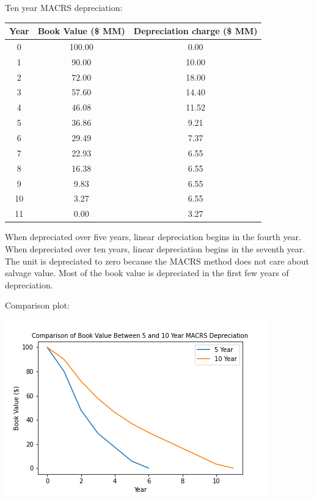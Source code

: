 \documentclass[12pt]{article}
\begin{document}
\begin{enumerate}
    Ten year MACRS depreciation:

    \begin{tabular}{|c|c|c|}
        \hline
        Year & Book Value (\$ MM) & Depreciation charge (\$ MM) \\
        \hline
        0 & 100.00 & 0.00 \\
        1 & 90.00 & 10.00 \\
        2 & 72.00 & 18.00 \\
        3 & 57.60 & 14.40 \\
        4 & 46.08 & 11.52 \\
        5 & 36.86 & 9.21 \\
        6 & 29.49 & 7.37 \\
        7 & 22.93 & 6.55 \\
        8 & 16.38 & 6.55 \\
        9 & 9.83 & 6.55	\\
        10 & 3.27 & 6.55 \\
        11 & 0.00 & 3.27 \\
        \hline
    \end{tabular}

    When depreciated over five years, linear depreciation begins in the fourth year. When depreciated over ten years, linear depreciation begins in the seventh year. The unit is depreciated to zero because the MACRS method does not care about salvage value. Most of the book value is depreciated in the first few years of depreciation.

    \newpage
    Comparison plot:

    \includegraphics{CHEN425_HW2_2.15_fig.png}


\end{enumerate}
\end{document}
